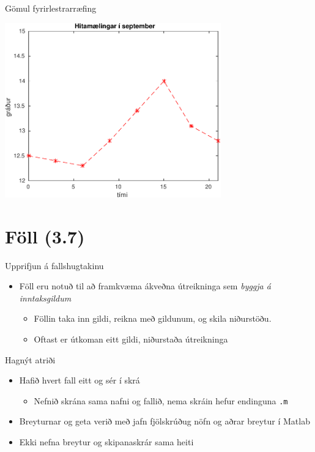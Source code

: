 \documentclass{beamer}
\begin{document}
\begin{frame}[fragile]{Gömul fyrirlestrarræfing}
\begin{center}
\includegraphics[width=0.7\textwidth]{../Pics/septemberhiti}
\end{center}
\end{frame}

\section{Föll (3.7)}

\begin{frame}{Upprifjun á fallshugtakinu}
\begin{itemize}
 \item Föll eru notuð til að framkvæma ákveðna útreikninga sem \emph{byggja á inntaksgildum}
 \begin{itemize}
  \item Föllin taka inn gildi, reikna með gildunum, og skila niðurstöðu.
  \item Oftast er útkoman eitt gildi, niðurstaða útreikninga
 \end{itemize}
\end{itemize}
\end{frame}

\begin{frame}[fragile]{Hagnýt atriði}
\begin{itemize}
 \item Hafið hvert fall eitt og sér í skrá
 \begin{itemize}
  \item Nefnið skrána sama nafni og fallið, nema skráin hefur endinguna \texttt{.m}
 \end{itemize}
 \item Breyturnar og geta verið með jafn fjölskrúðug nöfn og aðrar breytur í Matlab
 \item Ekki nefna breytur og skipanaskrár sama heiti
\end{itemize}
\end{frame}
\end{document}
